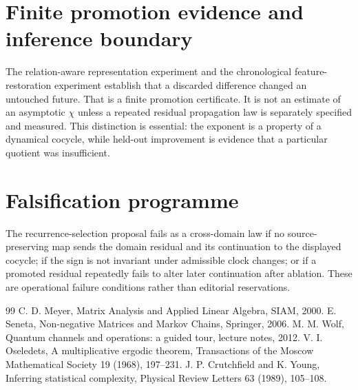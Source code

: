 \documentclass[11pt,a4paper]{article}
\begin{document}
\section{Finite promotion evidence and inference boundary}
The relation-aware representation experiment and the chronological feature-restoration experiment establish that a discarded difference changed an untouched future. That is a finite promotion certificate. It is not an estimate of an asymptotic $\chi$ unless a repeated residual propagation law is separately specified and measured. This distinction is essential: the exponent is a property of a dynamical cocycle, while held-out improvement is evidence that a particular quotient was insufficient.

\section{Falsification programme}
The recurrence-selection proposal fails as a cross-domain law if no source-preserving map sends the domain residual and its continuation to the displayed cocycle; if the sign is not invariant under admissible clock changes; or if a promoted residual repeatedly fails to alter later continuation after ablation. These are operational failure conditions rather than editorial reservations.

\begin{thebibliography}{99}
 C. D. Meyer, Matrix Analysis and Applied Linear Algebra, SIAM, 2000.
 E. Seneta, Non-negative Matrices and Markov Chains, Springer, 2006.
 M. M. Wolf, Quantum channels and operations: a guided tour, lecture notes, 2012.
 V. I. Oseledets, A multiplicative ergodic theorem, Transactions of the Moscow Mathematical Society 19 (1968), 197--231.
 J. P. Crutchfield and K. Young, Inferring statistical complexity, Physical Review Letters 63 (1989), 105--108.
\end{thebibliography}
\end{document}
